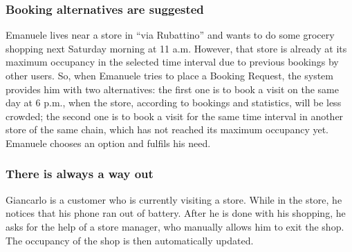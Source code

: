 \documentclass[a4paper,oneside,11pt]{book}   %
\begin{document}
        \subsubsection{Booking alternatives are suggested}
        Emanuele lives near a store in “via Rubattino” and wants to do some grocery shopping next Saturday morning at 11 a.m. However, that store is already at its maximum occupancy in the selected time interval due to previous bookings by other users. So, when Emanuele tries to place a Booking Request, the system provides him with two alternatives: the first one is to book a visit on the same day at 6 p.m., when the store, according to bookings and statistics, will be less crowded; the second one is to book a visit for the same time interval in another store of the same chain, which has not reached its maximum occupancy yet. Emanuele chooses an option and fulfils his need. 
        \subsubsection{There is always a way out}
        Giancarlo is a customer who is currently visiting a store. While in the store, he notices that his phone ran out of battery. After he is done with his shopping, he asks for the help of a store manager, who manually allows him to exit the shop. The occupancy of the shop is then automatically updated.
    
\end{document}

